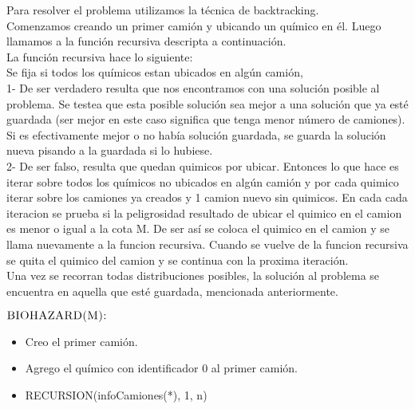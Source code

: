 \noindent
Para resolver el problema utilizamos la t\'ecnica de backtracking. \\
Comenzamos creando un primer cami\'on y ubicando un qu\'imico en \'el. Luego llamamos a la funci\'on recursiva descripta a continuaci\'on. \\
La funci\'on recursiva hace lo siguiente: \\
Se fija si todos los qu\'imicos estan ubicados en alg\'un cami\'on, \\
1- De ser verdadero resulta que nos encontramos con una soluci\'on posible al problema. Se testea que esta posible soluci\'on sea mejor a una soluci\'on que ya est\'e guardada (ser mejor en este caso significa que tenga menor n\'umero de camiones). Si es efectivamente mejor o no hab\'ia soluci\'on guardada, se guarda la soluci\'on nueva pisando a la guardada si lo hubiese. \\
2- De ser falso, resulta que quedan quimicos por ubicar. Entonces lo que hace es iterar sobre todos los qu\'imicos no ubicados en alg\'un cami\'on y por cada quimico iterar sobre los camiones ya creados y 1 camion nuevo sin quimicos. En cada cada iteracion se prueba si la peligrosidad resultado de ubicar el quimico en el camion es menor o igual a la cota M. De ser as\'i se coloca el quimico en el camion y se llama nuevamente a la funcion recursiva. Cuando se vuelve de la funcion recursiva se quita el quimico del camion y se continua con la proxima iteraci\'on. \\
Una vez se recorran todas distribuciones posibles, la soluci\'on al problema se encuentra en aquella que est\'e guardada, mencionada anteriormente. \\
\bigskip
\bigskip

\noindent
$\textnormal{\scshape BIOHAZARD(M):}$
\begin{itemize}
	\item Creo el primer cami\'on.
	\item Agrego el qu\'imico con identificador 0 al primer cami\'on.
	\item RECURSION(infoCamiones(*), 1, n)		
\end{itemize} 
\bigskip
\bigskip

